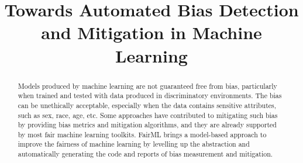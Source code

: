 \documentclass[final,5p,times,twocolumn]{elsarticle}
\begin{document}
\begin{frontmatter}



\title{Towards Automated Bias Detection and Mitigation in Machine Learning}


\author{}


\begin{abstract}
Models produced by machine learning are not guaranteed free from bias, particularly when trained and tested with data produced in discriminatory environments. The bias can be unethically acceptable, especially when the data contains sensitive attributes, such as sex, race, age, etc. Some approaches have contributed to mitigating such bias by providing bias metrics and mitigation algorithms, and they are already supported by most fair machine learning toolkits. FairML brings a model-based approach to improve the fairness of machine learning by levelling up the abstraction and automatically generating the code and reports of bias measurement and mitigation.
\end{abstract}


\end{frontmatter}
\end{document}
